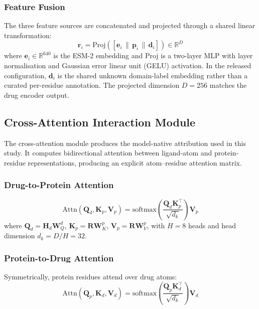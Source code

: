 \documentclass[fleqn,10pt]{wlscirep}
\begin{document}
\subsubsection{Feature Fusion}

The three feature sources are concatenated and projected through a shared linear
transformation:
\begin{equation}
\mathbf{r}_i = \mathrm{Proj}\!\left(
  [\mathbf{e}_i \,\|\, \mathbf{p}_i \,\|\, \mathbf{d}_i]
\right) \in \mathbb{R}^{D}
\end{equation}
where $\mathbf{e}_i \in \mathbb{R}^{640}$ is the ESM-2 embedding and Proj is a
two-layer MLP with layer normalisation and Gaussian error linear unit (GELU)
activation. In the released configuration, $\mathbf{d}_i$ is the shared unknown
domain-label embedding rather than a curated per-residue annotation. The projected
dimension $D=256$ matches the drug encoder output.

\subsection{Cross-Attention Interaction Module}

The cross-attention module produces the model-native attribution used in this
study. It computes bidirectional attention between ligand-atom and
protein-residue representations, producing an explicit atom--residue attention
matrix.

\subsubsection{Drug-to-Protein Attention}

\begin{equation}
\mathrm{Attn}(\mathbf{Q}_d,\mathbf{K}_p,\mathbf{V}_p) =
  \mathrm{softmax}\!\left(\frac{\mathbf{Q}_d\mathbf{K}_p^\top}{\sqrt{d_k}}\right)
  \mathbf{V}_p
\end{equation}
where $\mathbf{Q}_d = \mathbf{H}_d\mathbf{W}_Q^d$,
$\mathbf{K}_p = \mathbf{R}\mathbf{W}_K^p$,
$\mathbf{V}_p = \mathbf{R}\mathbf{W}_V^p$, with $H=8$ heads and head
dimension $d_k = D/H = 32$.

\subsubsection{Protein-to-Drug Attention}

Symmetrically, protein residues attend over drug atoms:
\begin{equation}
\mathrm{Attn}(\mathbf{Q}_p,\mathbf{K}_d,\mathbf{V}_d) =
  \mathrm{softmax}\!\left(\frac{\mathbf{Q}_p\mathbf{K}_d^\top}{\sqrt{d_k}}\right)
  \mathbf{V}_d
\end{equation}
\end{document}
